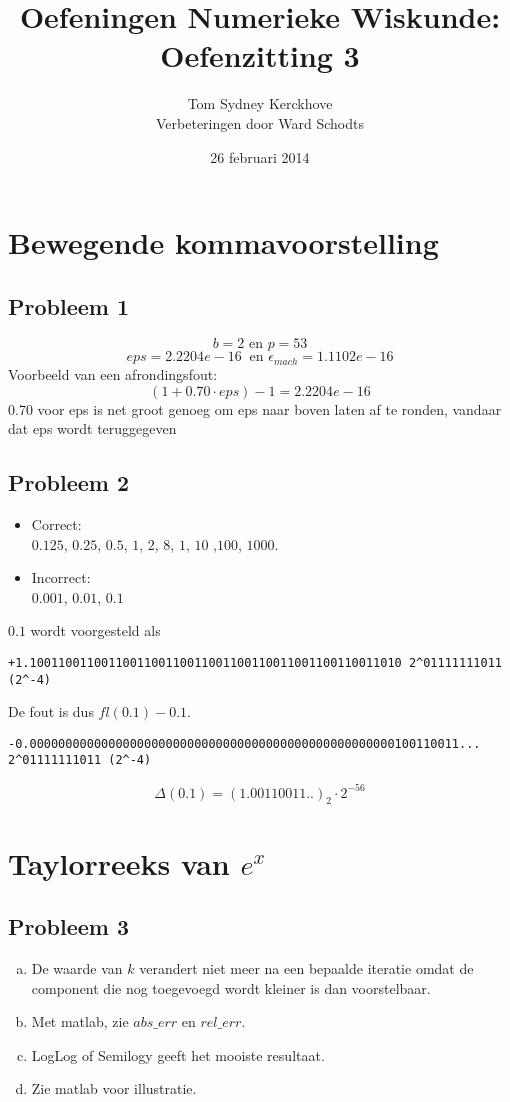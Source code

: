 \documentclass[12pt,a4paper]{article}
\author{Tom Sydney Kerckhove
		\\ Verbeteringen door Ward Schodts}
\title{Oefeningen Numerieke Wiskunde:\\ Oefenzitting 3}
\date{26 februari 2014}
\begin{document}
\maketitle
\section{Bewegende kommavoorstelling}
\subsection{Probleem 1}
\[
b = 2 \text{ en } p = 53
\]
\[
eps = 2.2204e-16\ \text{ en } \epsilon_{mach} = 1.1102e-16
\]
Voorbeeld van een afrondingsfout:
\[
(1+0.70\cdot eps) -1 = 2.2204e-16
\]
0.70 voor eps is net groot genoeg om eps naar boven laten af te ronden, vandaar dat eps wordt teruggegeven
\subsection{Probleem 2}
\begin{itemize}
\item Correct:\\
$0.125$, $0.25$, $0.5$, $1$, $2$, $8$, $1$, $10$ ,$100$, $1000$.
\item Incorrect:\\
$0.001$, $0.01$, $0.1$
\end{itemize}
$0.1$ wordt voorgesteld als
{\scriptsize \begin{verbatim}
+1.1001100110011001100110011001100110011001100110011010 2^01111111011 (2^-4)
\end{verbatim}}
De fout is dus $fl(0.1)-0.1$.
{\scriptsize \begin{verbatim}
-0.000000000000000000000000000000000000000000000000000100110011...  2^01111111011 (2^-4)
\end{verbatim}}
\[
\Delta(0.1) = (1.00110011..)_{2} \cdot 2^{-56}
\]
\section{Taylorreeks van $e^x$}
\subsection{Probleem 3}
\begin{enumerate}[(a)]
\item
De waarde van $k$ verandert niet meer na een bepaalde iteratie omdat de component die nog toegevoegd wordt kleiner is dan voorstelbaar.

\item
Met matlab, zie $abs\_err$ en $rel\_err$.

\item
LogLog of Semilogy geeft het mooiste resultaat.

\item
Zie matlab voor illustratie.

\end{enumerate}
\end{document}
